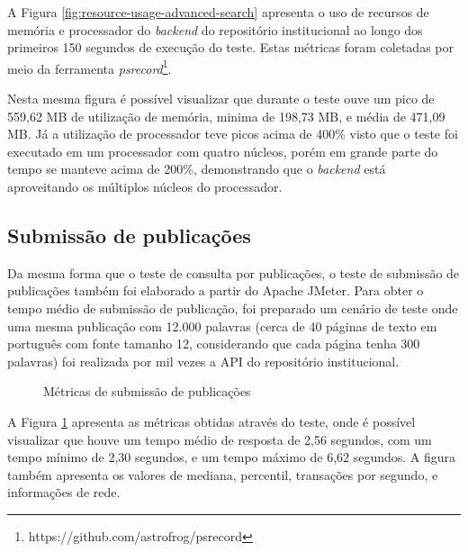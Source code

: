 A Figura \ref{fig:resource-usage-advanced-search} apresenta o uso de recursos
de memória e processador do \emph{backend} do repositório institucional ao longo
dos primeiros 150 segundos de execução do teste. Estas métricas foram coletadas por
meio da ferramenta \emph{psrecord}\footnote{https://github.com/astrofrog/psrecord}.

Nesta mesma figura é possível visualizar que durante o teste ouve um pico de 559,62 MB
de utilização de memória, minima de 198,73 MB, e média de 471,09 MB. Já a utilização de
processador teve picos acima de 400\% visto que o teste foi executado em um
processador com quatro núcleos, porém em grande parte do tempo se manteve acima de 200\%,
demonstrando que o \emph{backend} está aproveitando os múltiplos núcleos do processador.

\subsection{Submissão de publicações}

Da mesma forma que o teste de consulta por publicações, o teste de submissão de
publicações também foi elaborado a partir do Apache JMeter. Para obter o tempo médio
de submissão de publicação, foi preparado um cenário de teste onde uma mesma publicação
com 12.000 palavras (cerca de 40 páginas de texto em português com fonte tamanho 12,
considerando que cada página tenha 300 palavras) foi realizada por mil vezes a API do
repositório institucional.

\begin{figure}[H]
    \caption{Métricas de submissão de publicações}
    \label{fig:matrics-create-research}
\end{figure}

A Figura \ref{fig:matrics-create-research} apresenta as métricas obtidas através do
teste, onde é possível visualizar que houve um tempo médio de resposta de 2,56 segundos,
com um tempo mínimo de 2,30 segundos, e um tempo máximo de 6,62 segundos. A figura também
apresenta os valores de mediana, percentil, transações por segundo, e informações de rede.


